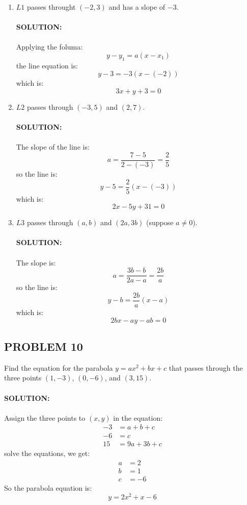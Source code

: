 \documentclass{article}
\begin{document}
\begin{enumerate}[label=(\alph*),itemsep=4ex,partopsep=1ex]
\item $L1$ passes throught $(-2,3)$ and has a slope of $-3$. \\\\
\textbf{SOLUTION:}\\\\
Applying the foluma: $$y - y_1 = a(x - x_1)$$
the line equation is: $$y - 3 = -3(x-(-2))$$
which is:$$3x+y+3=0$$

\item $L2$ passes through $(-3, 5)$ and $(2,7)$. \\\\
\textbf{SOLUTION:}\\\\
The slope of the line is: $$a = \frac{7-5}{2-(-3)} = \frac{2}{5}$$
so the line is: $$y - 5 = \frac{2}{5}(x - (-3)) $$
which is: $$2x - 5y + 31 = 0$$

\item $L3$ passes through $(a,b)$ and $(2a,3b)$ (suppose $a \neq 0$). \\\\
\textbf{SOLUTION:}\\\\
The slope is: $$a=\frac{3b-b}{2a-a}=\frac{2b}{a}$$
so the line is: $$y - b=\frac{2b}{a}(x - a)$$
which is: $$2bx - ay -ab = 0$$

\end{enumerate}


\subsection*{PROBLEM 10}
\vspace{1em}
Find the equation for the parabola $y=ax^2 + bx + c$ that passes through the 
three points $(1,-3)$, $(0,-6)$, and $(3,15)$.
\vspace{1em}
\\\\\textbf{SOLUTION:}\\\\
Assign the three points to $(x,y)$ in the equation:
\begin{equation*}
\begin{aligned}
-3 &= a + b + c \\
-6 &= c \\
15 &= 9a + 3b + c
\end{aligned}
\end{equation*}
solve the equations, we get:
\begin{equation*}
\begin{aligned}
a &= 2\\
b &= 1\\
c &= -6
\end{aligned}
\end{equation*}
So the parabola equation is: $$y = 2x^2 + x - 6$$
\end{document}
